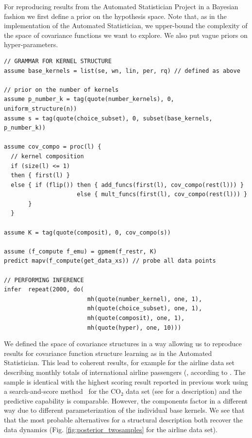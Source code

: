For reproducing results from the Automated Statistician Project in a Bayesian fashion we first define a prior on the hypothesis space. Note that, as in the implementation of the Automated Statistician, we upper-bound the complexity of the space of covariance functions we want to explore. We also put vague priors on hyper-parameters.

\begin{minipage}{\linewidth}
\small
\belowcaptionskip=-10pt
\begin{lstlisting}[frame=single,mathescape,label=alg:structureVent,basicstyle=\selectfont\ttfamily,numbers=none]
// GRAMMAR FOR KERNEL STRUCTURE
assume base_kernels = list(se, wn, lin, per, rq) // defined as above

// prior on the number of kernels
assume p_number_k = tag(quote(number_kernels), 0, uniform_structure(n))
assume s = tag(quote(choice_subset), 0, subset(base_kernels, p_number_k))

assume cov_compo = proc(l) {
  // kernel composition
  if (size(l) <= 1)
  then { first(l) }
  else { if (flip()) then { add_funcs(first(l), cov_compo(rest(l))) }
                     else { mult_funcs(first(l), cov_compo(rest(l))) }
       }
  }
                          
assume K = tag(quote(composit), 0, cov_compo(s))

assume (f_compute f_emu) = gpmem(f_restr, K)
predict mapv(f_compute(get_data_xs)) // probe all data points

// PERFORMING INFERENCE  
infer  repeat(2000, do(
                        mh(quote(number_kernel), one, 1),
                        mh(quote(choice_subset), one, 1),
                        mh(quote(composit), one, 1),
                        mh(quote(hyper), one, 10)))
\end{lstlisting}

\end{minipage}




We defined the space of covariance structures in a way allowing us to reproduce results for covariance function structure learning as in the Automated Statistician. This lead to coherent results, for example for the airline data set describing monthly totals of international airline passengers (\citealp{box2011time}, according to \citealp{duvenaud2013structure}. The sample is identical with the highest scoring result reported in previous work using a search-and-score method~\citep{duvenaud2013structure} for the CO$_2$ data set (see \citealp{rasmussen2006gaussian} for a description) and the predictive capability is comparable. However, the components factor in a different way due to different parameterization of the individual base kernels. We see that that the most probable alternatives for a structural description both recover the data dynamics (Fig. \ref{fig:posterior_twosamples} for the airline data set).

